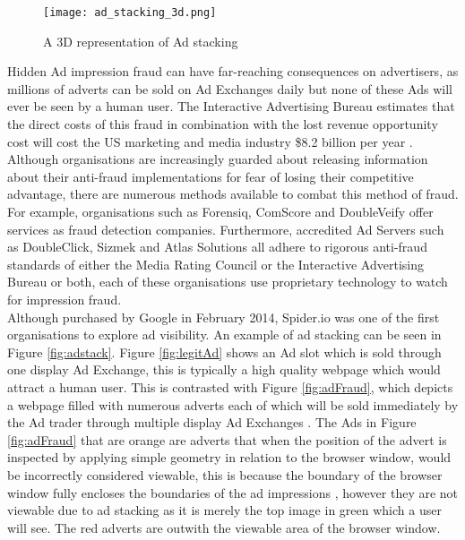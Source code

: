 \documentclass[12pt]{article}
\begin{document}
\begin{figure}[H]
    \centering
    \texttt{[image: ad\_stacking\_3d.png]}
    \caption{A 3D representation of Ad stacking}
    \label{fig:ad_stacking_3d}
\end{figure}

Hidden Ad impression fraud can have far-reaching consequences on advertisers, as millions of adverts can be sold on Ad Exchanges daily but none of these Ads will ever be seen by a human user. The Interactive Advertising Bureau estimates that the direct costs of this fraud in combination with the lost revenue opportunity cost will cost the US marketing and media industry \$8.2 billion per year \parencite{iabfraud}. Although organisations are increasingly guarded about releasing information about their anti-fraud implementations for fear of losing their competitive advantage, there are numerous methods available to combat this method of fraud. For example, organisations such as Forensiq, ComScore and DoubleVeify offer services as fraud detection companies. Furthermore, accredited Ad Servers such as DoubleClick, Sizmek and Atlas Solutions all adhere to rigorous anti-fraud standards of either the Media Rating Council or the Interactive Advertising Bureau or both, each of these organisations use proprietary technology to watch for impression fraud. \\

Although purchased by Google in February 2014, Spider.io was one of the first organisations to explore ad visibility. An example of ad stacking can be seen in Figure \ref{fig:adstack}. Figure \ref{fig:legitAd} shows an Ad slot which is sold through one display Ad Exchange, this is typically a high quality webpage which would attract a human user. This is contrasted with Figure \ref{fig:adFraud}, which depicts a webpage filled with numerous adverts each of which will be sold immediately by the Ad trader through multiple display Ad Exchanges \parencite{spiderIo}. The Ads in Figure \ref{fig:adFraud} that are orange are adverts that when the position of the advert is inspected by applying simple geometry in relation to the browser window, would be incorrectly considered viewable, this is because the boundary of the browser window fully encloses the boundaries of the ad impressions \parencite{spiderIo}, however they are not viewable due to ad stacking as it is merely the top image in green which a user will see. The red adverts are outwith the viewable area of the browser window.  \\ 
\end{document}
